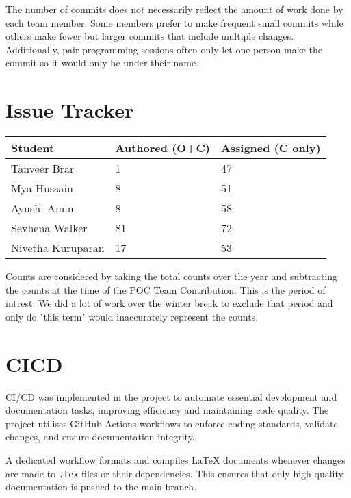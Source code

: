 \documentclass{article}
\begin{document}
The number of commits does not necessarily reflect the amount of work done by each team member. Some members prefer to make frequent small commits while others make fewer but larger commits that include multiple changes.
Additionally, pair programming sessions often only let one person make the commit so it would only be under their name.

\section{Issue Tracker}


\begin{table}[H]
\centering
\begin{tabular}{lll}
\toprule
\textbf{Student} & \textbf{Authored (O+C)} & \textbf{Assigned (C only)}\\
\midrule
Tanveer Brar & 1 & 47 \\
Mya Hussain & 8 & 51 \\
Ayushi Amin & 8 & 58 \\
Sevhena Walker & 81 & 72 \\
Nivetha Kuruparan & 17 & 53 \\
\bottomrule
\end{tabular}
\end{table}

Counts are considered by taking the total counts over the year and subtracting the counts at the time of the POC Team Contribution. This is the period of intrest. 
We did a lot of work over the winter break to exclude that period and only do "this term" would inaccurately represent the counts.
\section{CICD}


CI/CD was implemented in the project to automate essential
development and documentation tasks, improving efficiency and
maintaining code quality. The project utilises GitHub Actions
workflows to enforce coding standards, validate changes, and ensure
documentation integrity.

A dedicated workflow formats and compiles \LaTeX{} documents whenever
changes are made to \texttt{.tex} files or their dependencies. This ensures that
only high quality documentation is pushed to the main branch.
\end{document}
